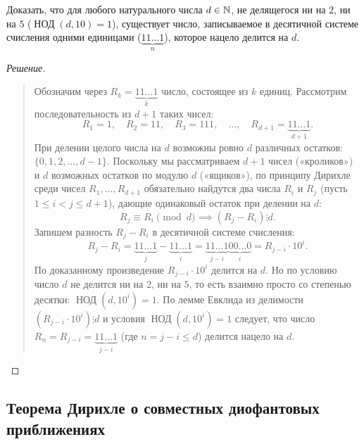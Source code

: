 \begin{problem}
    Доказать, что для любого натурального числа $d \in \mathbb{N}$, не делящегося 
    ни на $2$, ни на $5$ ($\operatorname{НОД}(d, 10) = 1$), существует 
    число, записываемое в десятичной системе счисления одними единицами 
    ($\underbrace{11\dots 1}_{n}$), которое нацело делится на $d$.
\end{problem}

\begin{proof}[Решение]~\\
    \begin{quote}
        Обозначим через $R_k = \underbrace{11\dots 1}_{k}$ число, состоящее 
        из $k$ единиц. Рассмотрим последовательность из $d + 1$ таких чисел:
        \[
            R_1 = 1, \quad R_2 = 11, \quad R_3 = 111, \quad \dots, \quad 
            R_{d+1} = \underbrace{11\dots 1}_{d+1}.
        \]
        При делении целого числа на $d$ возможны ровно $d$ различных 
        остатков: $\{0, 1, 2, \dots, d - 1\}$. Поскольку мы рассматриваем 
        $d + 1$ чисел («кроликов») и $d$ возможных остатков по модулю $d$ 
        («ящиков»), по принципу Дирихле среди чисел $R_1, \dots, R_{d+1}$ 
        обязательно найдутся два числа $R_i$ и $R_j$ (пусть $1 \le i < j \le d + 1$), 
        дающие одинаковый остаток при делении на $d$:
        \[
            R_j \equiv R_i \pmod{d} \implies (R_j - R_i) \vdots d.
        \]
        Запишем разность $R_j - R_i$ в десятичной системе счисления:
        \begin{equation} \label{eq:repunit_diff}
            R_j - R_i = \underbrace{11\dots 1}_{j} - \underbrace{11\dots 1}_{i} = 
            \underbrace{11\dots 1}_{j-i}\underbrace{00\dots 0}_{i} = 
            R_{j-i} \cdot 10^i. \tag{2}
        \end{equation}
        По доказанному произведение $R_{j-i} \cdot 10^i$ делится на $d$. 
        Но по условию число $d$ не делится ни на $2$, ни на $5$, то есть 
        взаимно просто со степенью десятки: $\operatorname{НОД}(d, 10^i) = 1$. 
        По лемме Евклида из делимости $(R_{j-i} \cdot 10^i) \vdots d$ и 
        условия $\operatorname{НОД}(d, 10^i) = 1$ следует, что число 
        $R_n = R_{j-i} = \underbrace{11\dots 1}_{j-i}$ (где $n = j - i \le d$) 
        делится нацело на $d$.
    \end{quote}
\end{proof}

\subsection{Теорема Дирихле о совместных диофантовых приближениях}

